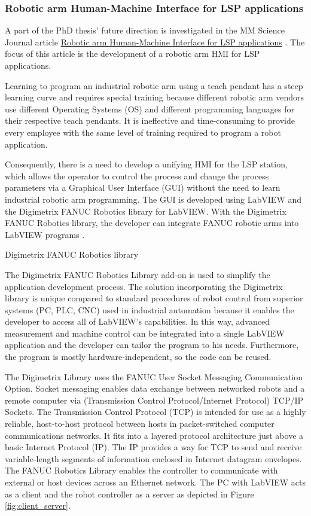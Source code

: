 \subsubsection*{Robotic arm Human-Machine Interface for LSP applications}
\label{sec:mm_science}
A part of the PhD thesis' future direction is investigated in the MM Science Journal article \href{https://www.mmscience.eu/journal/issues/december-2019/articles/robotic-arm-human-machine-interface-for-laser-shock-peening-applications}{Robotic arm Human-Machine Interface for LSP applications} \cite{bohm_kaufman_brajer_rostohar_2019}.   The focus of this article is the development of a robotic arm HMI for LSP applications.

Learning to program an industrial robotic arm using a teach pendant has a steep learning curve and requires special training because different robotic arm vendors use different Operating Systems (OS) and different programming languages for their respective teach pendants. It is ineffective and time-consuming to provide every employee with the same level of training required to program a robot application. 

Consequently, there is a need to develop a unifying HMI for the LSP station, which allows the operator to control the process and change the process parameters via a Graphical User Interface (GUI) without the need to learn industrial robotic arm programming. The GUI is developed using LabVIEW and the Digimetrix FANUC Robotics library for LabVIEW. With the Digimetrix FANUC Robotics library, the developer can integrate FANUC robotic arms into LabVIEW programs \cite{bohm_kaufman_brajer_rostohar_2019}. 

\smallskip
Digimetrix FANUC Robotics library

The Digimetrix FANUC Robotics Library add-on is used to simplify the application development process. The solution incorporating the Digimetrix library is unique compared to standard procedures of robot control from superior systems (PC, PLC, CNC) used in industrial automation because it enables the developer to access all of LabVIEW's capabilities. In this way, advanced measurement and machine control can be integrated into a single LabVIEW application and the developer can tailor the program to his needs. Furthermore, the program is mostly hardware-independent, so the code can be reused.

The Digimetrix Library uses the FANUC User Socket Messaging Communication Option. Socket messaging enables data exchange between networked robots and a remote computer via (Transmission Control Protocol/Internet Protocol) TCP/IP Sockets. The Transmission Control Protocol (TCP) is intended for use as a highly reliable, host-to-host protocol between hosts in packet-switched computer communications networks. It fits into a layered protocol architecture just above a basic Internet Protocol (IP). The IP provides a way for TCP to send and receive variable-length segments of information enclosed in Internet datagram envelopes. The FANUC Robotics Library enables the controller to communicate with external or host devices across an Ethernet network. The PC with LabVIEW acts as a client and the robot controller as a server as depicted in Figure \ref{fig:client_server}.

